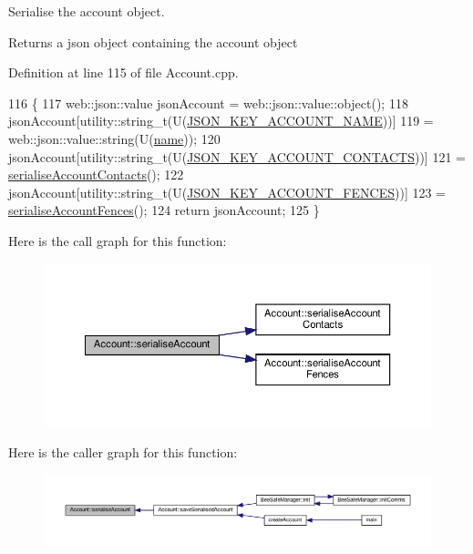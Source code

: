 Serialise the account object.

\begin{DoxyReturn}{Returns}
a json object containing the account object 
\end{DoxyReturn}


Definition at line 115 of file Account.\+cpp.


\begin{DoxyCode}
116 \{
117     web::json::value jsonAccount = web::json::value::object();
118     jsonAccount[utility::string\_t(U(\hyperlink{_account_8h_ac2f820be22c4390a71ec34abe54694c5}{JSON\_KEY\_ACCOUNT\_NAME}))]
119             = web::json::value::string(U(\hyperlink{class_account_a586e2c3461c5231eacf7c96851024a75}{name}));
120     jsonAccount[utility::string\_t(U(\hyperlink{_account_8h_a9a5dc301a4b04c85ce3b865530cd6ca7}{JSON\_KEY\_ACCOUNT\_CONTACTS}))]
121             = \hyperlink{class_account_a7f2d9836817ee851f723f6d3b1ff74a5}{serialiseAccountContacts}();
122     jsonAccount[utility::string\_t(U(\hyperlink{_account_8h_a83ba8a12dba5582a5a125d3ced877c6e}{JSON\_KEY\_ACCOUNT\_FENCES}))]
123             = \hyperlink{class_account_a426837a406852a6e6b11eda85828fc58}{serialiseAccountFences}();
124     \textcolor{keywordflow}{return} jsonAccount;
125 \}
\end{DoxyCode}
Here is the call graph for this function\+:\nopagebreak
\begin{figure}[H]
\begin{center}
\leavevmode
\includegraphics[width=350pt]{db/d22/class_account_a1e9b184e8a6ddf67e8814e6c575f657e_cgraph}
\end{center}
\end{figure}
Here is the caller graph for this function\+:\nopagebreak
\begin{figure}[H]
\begin{center}
\leavevmode
\includegraphics[width=350pt]{db/d22/class_account_a1e9b184e8a6ddf67e8814e6c575f657e_icgraph}
\end{center}
\end{figure}
\mbox{\label{class_account_a7f2d9836817ee851f723f6d3b1ff74a5}} 
